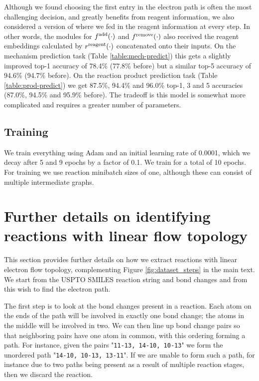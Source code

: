 Although we found choosing the first entry in the electron path is often the most challenging decision, and greatly benefits from reagent information, we also considered a version of \ourModel where we fed in the reagent information at every step.
In other words, the modules for $f^{\textrm{add}}(\cdot)$ and $f^{\textrm{remove}}(\cdot)$ also received  the reagent embeddings calculated by $r^{\textrm{reagent}}(\cdot)$ concatenated onto their inputs.
On the mechanism prediction task (Table \ref{table:mech-predict}) this gets a slightly improved top-1 accuracy of 78.4\% (77.8\% before) but a similar top-5 accuracy of 94.6\% (94.7\% before).
 On the reaction product prediction task (Table \ref{table:prod-predict}) we get 87.5\%, 94.4\% and 96.0\% top-1, 3 and 5 accuracies (87.0\%, 94.5\% and 95.9\% before). 
 The tradeoff is this model is somewhat more complicated and requires a greater number of parameters.

\subsection{Training}

We train everything using Adam \citep{kingma2014adam} and an initial learning rate of 0.0001, which we decay after 5 and 9 epochs by a factor of 0.1. 
We train for a total of 10 epochs.
For training we use reaction minibatch sizes of one, although these can consist of multiple intermediate graphs.






\section{Further details on identifying reactions with linear flow topology}
\label{sect:electron_path_identify}

This section provides further details on how we extract reactions with linear electron flow topology, complementing Figure \ref{fig:dataset_steps} in the main text. 
We start from the USPTO SMILES reaction string and bond changes and from this wish to find the electron path.

The first step is to look at the bond changes present in a reaction. 
Each atom on the ends of the path will be involved in exactly one bond change;
the atoms in the middle will be involved in two. 
We can then line up bond change pairs so that neighboring pairs have one atom in common,
 with this ordering forming a path.
For instance, given the pairs "\texttt{11-13, 14-10, 10-13}" we form the unordered path "\texttt{14-10, 10-13, 13-11}".
If we are unable to form such a path, for instance due to two paths being present as a result of multiple reaction stages, then we discard the reaction.

